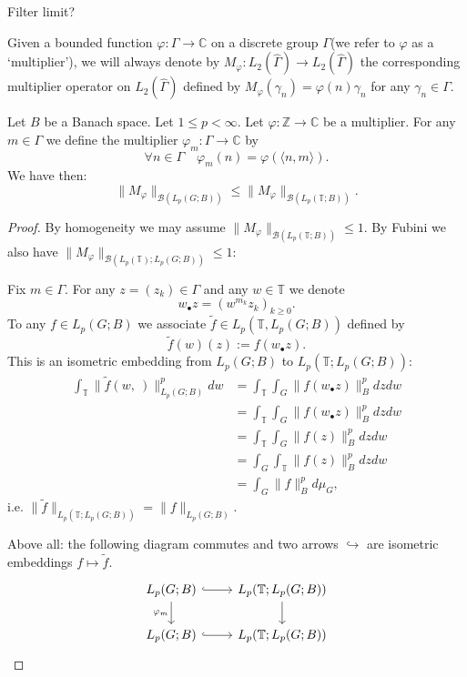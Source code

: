 \begin{remark}
    Filter limit?
\end{remark}

\begin{definition}[Multiplier]
    Given a bounded function $\varphi\colon \Gamma\to\mathbb{C}$ on a discrete group $\Gamma$(we refer to $\varphi$ as
    a ‘multiplier’), we will always denote by $M_\varphi\colon L_2(\widehat{\Gamma})\to L_2(\widehat{\Gamma})$ the corresponding 
    multiplier operator on $L_2(\widehat{\Gamma})$ defined by $M_\varphi(\gamma_n)=\varphi(n)\gamma_n$ for any $\gamma_n\in\Gamma$. 
\end{definition}

\begin{lemma}\label{lem: trans}
    Let $B$ be a Banach space. Let $1\leq p<\infty$. Let $\varphi\colon \mathbb{Z}\to\mathbb{C}$ be a multiplier. For
    any $m\in \Gamma$ we define the multiplier $\varphi_m\colon\Gamma\to\mathbb{C}$ by
        \[\forall n\in\Gamma\quad \varphi_m(n)=\varphi(\langle n,m\rangle). \]
    We have then:
        \[  \|M_\varphi\|_{\mathcal{B}(L_p(G;B))}\leq\|M_\varphi\|_{\mathcal{B}(L_p(\mathbb{T};B))}.\]
\end{lemma}
\begin{proof}
By homogeneity we may assume $\|M_\varphi\|_{\mathcal{B}(L_p(\mathbb{T};B))}\leq1$. By Fubini we also have $\|M_\varphi\|_{\mathcal{B}(L_p(\mathbb{T});L_p(G;B))}\leq1$:

Fix $m \in \Gamma$. For any $z = (z_k) \in \Gamma$ and any $w \in \mathbb{T}$ we denote
    \[
        w_{\bullet}z = (w^{m_k} z_k)_{k \geq 0}.
    \]
To any $f \in L_p(G; B)$ we associate $\widetilde{f} \in L_p(\mathbb{T}, L_p(G; B))$ defined by
    \[
        \widetilde{f}(w)(z) := f(w_{\bullet}z).
    \]
This is an isometric embedding from $L_p(G;B)$ to $L_p(\mathbb{T};L_p(G;B))$:
    \begin{align*}
        \int_{\mathbb{T}}\|\widetilde{f}(w,\ )\|_{L_p(G;B)}^{p} dw
        &=\int_{\mathbb{T}}\int_{G} \|f(w_{\bullet}z)\|_B^p dz dw\\
        &=\int_{\mathbb{T}}\int_{G} \|f(w_{\bullet}z)\|_B^p dz dw\\
        &=\int_{\mathbb{T}}\int_{G} \|f(z)\|_B^p dz dw\\
        &=\int_{G}\int_{\mathbb{T}} \|f(z)\|_B^p dz dw\\
        &=\int_{G} \|f\|_B^p d\mu_G,
    \end{align*}
i.e. $\|\widetilde{f}\|_{L_p(\mathbb{T};L_p(G;B))}=\|f\|_{L_p(G;B)}$. 

Above all: the following diagram commutes and two arrows $\hookrightarrow$ are isometric embeddings $f\mapsto\widetilde{f}$.
    \[\begin{tikzcd}
        L_p(G;B) \arrow[d, "\varphi_m"'] \arrow[r, hook] & L_p(\mathbb{T};L_p(G;B)) \arrow[d] \\
        L_p(G;B) \arrow[r, hook]                         & L_p(\mathbb{T};L_p(G;B))          
        \end{tikzcd}\]
    \end{proof}
